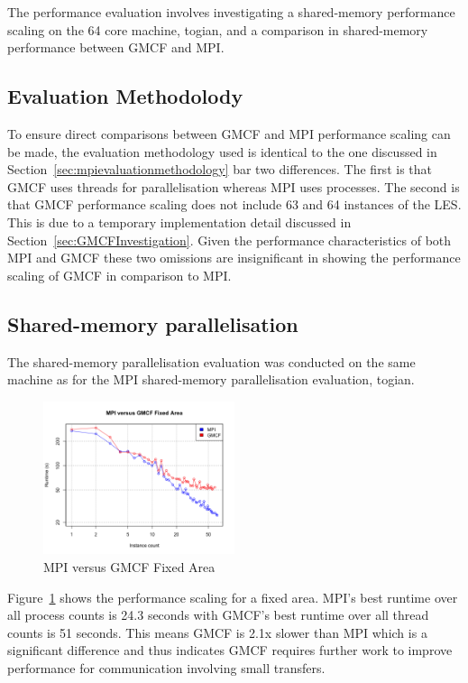 The performance evaluation involves investigating a shared-memory performance
scaling on the 64 core machine, togian, and a comparison in shared-memory
performance between GMCF and MPI.

\subsection{Evaluation Methodolody}

To ensure direct comparisons between GMCF and MPI performance scaling can be
made, the evaluation methodology used is identical to the one discussed in
Section~\ref{sec:mpievaluationmethodology} bar two differences. The first is
that GMCF uses threads for parallelisation whereas MPI uses processes. The
second is that GMCF performance scaling does not include 63 and 64 instances of
the LES. This is due to a temporary implementation detail discussed in
Section~\ref{sec:GMCFInvestigation}. Given the performance characteristics of
both MPI and GMCF these two omissions are insignificant in showing the
performance scaling of GMCF in comparison to MPI.

\subsection{Shared-memory parallelisation}

The shared-memory parallelisation evaluation was conducted on the same machine
as for the MPI shared-memory parallelisation evaluation, togian.

\begin{figure}
    \includegraphics[width=0.5\textwidth]{graphs/GMCF-MPI-fixed-area.png}
    \caption{MPI versus GMCF Fixed Area}
    \label{fig:gmcfmpifixedarea}
\end{figure}

Figure~\ref{fig:gmcfmpifixedarea} shows the performance scaling for a fixed
area. MPI's best runtime over all process counts is 24.3 seconds with GMCF's
best runtime over all thread counts is 51 seconds. This means GMCF is 2.1x
slower than MPI which is a significant difference and thus indicates GMCF
requires further work to improve performance for communication involving small
transfers.

